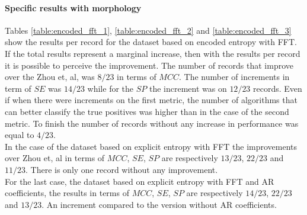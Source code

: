 \paragraph{Specific results with morphology}
Tables \ref{table:encoded_fft_1}, \ref{table:encoded_fft_2} and \ref{table:encoded_fft_3} show the results per record for the dataset based on encoded entropy with FFT. If the total results represent a marginal increase, then with the results per record it is possible to perceive the improvement. The number of records that improve over the Zhou et, al, was $8/23$ in terms of $MCC$. The number of increments in term of $SE$ was $14/23$ while for the $SP$ the increment was on $12/23$ records. Even if when there were increments on the first metric, the number of algorithms that can better classify the true positives was higher than in the case of the second metric. To finish the number of records without any increase in performance was equal to $4/23$.\\
In the case of the dataset based on explicit entropy with FFT the improvements over Zhou et, al in terms of $MCC$, $SE$, $SP$ are respectively $13/23$, $22/23$ and $11/23$. There is only one record without any improvement. \\
For the last case, the dataset based on explicit entropy with FFT and AR coefficients, the results in terms of $MCC$, $SE$, $SP$ are respectively $14/23$, $22/23$ and $13/23$. An increment compared to the version without AR coefficients.

